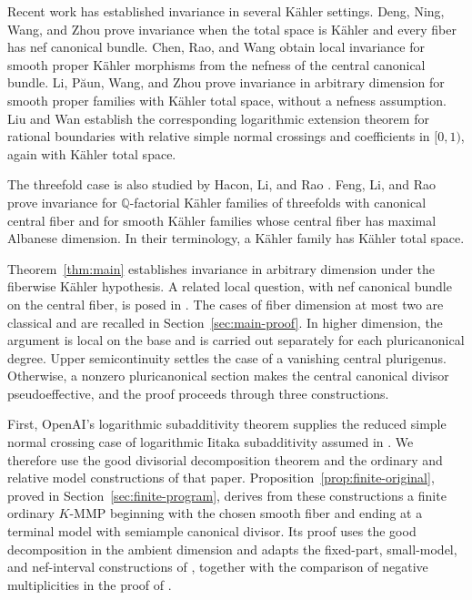 \documentclass[11pt,a4paper]{article}
\theoremstyle{definition}\newtheorem{definition}[theorem]{Definition}
\theoremstyle{remark}\newtheorem*{remark}{Remark}
\newcommand{\Q}{\mathbb Q}\newcommand{\C}{\mathbb C}
\begin{document}
Recent work has established invariance in several Kähler settings.
Deng, Ning, Wang, and Zhou \cite[Theorem~1.1]{DNWZ2026} prove
invariance when the total space is Kähler and every fiber has nef
canonical bundle. Chen, Rao, and Wang
\cite[Theorems~1.2--1.4]{CRW2026} obtain local invariance for smooth
proper Kähler morphisms from the nefness of the central canonical
bundle. Li, Păun, Wang, and Zhou \cite[Theorem~1.2]{LPWZ2026}
prove invariance in arbitrary dimension for smooth proper families
with Kähler total space, without a nefness assumption.
Liu and Wan \cite[Theorem~1.1]{LW2026} establish the corresponding
logarithmic extension theorem for rational boundaries with relative
simple normal crossings and coefficients in $[0,1)$, again with
Kähler total space.

The threefold case is also studied by Hacon, Li, and Rao
\cite[Theorem~6.5]{HLR2026}. Feng, Li, and Rao
\cite[Theorems~1.4 and~1.5]{FLR2026} prove invariance for
$\Q$-factorial Kähler families of threefolds with canonical central
fiber and for smooth Kähler families whose central fiber has maximal
Albanese dimension.
In their terminology, a Kähler family has Kähler total space.

Theorem~\ref{thm:main} establishes invariance in arbitrary dimension
under the fiberwise Kähler hypothesis.
A related local question, with nef canonical bundle on the central
fiber, is posed in \cite[Question~1.6]{CRW2026}.
The cases of fiber dimension at most two are classical and are recalled
in Section~\ref{sec:main-proof}. In higher dimension, the argument is
local on the base and is carried out separately for each pluricanonical
degree. Upper semicontinuity settles the case of a vanishing central
plurigenus. Otherwise, a nonzero pluricanonical section makes the
central canonical divisor pseudoeffective, and the proof proceeds
through three constructions.

First, OpenAI's logarithmic subadditivity theorem
\cite[Corollary~6.2]{OAI033} supplies the reduced simple normal crossing
case of logarithmic Iitaka subadditivity assumed in
\cite[Assumption~1.1]{OAI034}. We therefore use the good divisorial
decomposition theorem \cite[Theorem~2.13]{OAI034} and the ordinary and
relative model constructions of that paper.
Proposition~\ref{prop:finite-original}, proved in
Section~\ref{sec:finite-program}, derives from these constructions
a finite ordinary $K$-MMP beginning with the
chosen smooth fiber and ending at a terminal model with semiample
canonical divisor. Its proof uses the good decomposition in the ambient
dimension and adapts the fixed-part, small-model, and nef-interval
constructions of \cite[Proposition~3.8 and Lemmas~3.11--3.12]{OAI034},
together with the comparison of negative multiplicities in the proof of
\cite[Theorem~3.13]{OAI034}.
\end{document}
